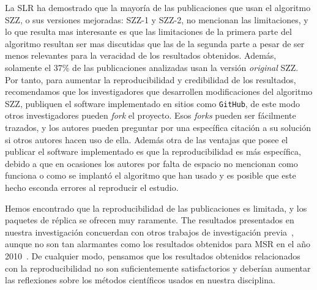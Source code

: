 \documentclass[a4paper, 12pt]{book}
\begin{document}
La SLR ha demostrado que la mayor\'ia de las publicaciones que usan el algoritmo SZZ, o sus versiones mejoradas: SZZ-1 y SZZ-2, no mencionan las limitaciones, y lo que resulta mas interesante es que las limitaciones de la primera parte del algoritmo resultan ser mas discutidas que las de la segunda parte a pesar de ser menos relevantes para la veracidad de los resultados obtenidos. Adem\'as, solamente el 37\% de las publicaciones analizadas usan la versi\'on \emph{original} SZZ.  Por tanto, para aumentar la reproducibilidad y credibilidad de los resultados, recomendamos que los investigadores que desarrollen modificaciones del algoritmo SZZ, publiquen el software implementado en sitios como \texttt{GitHub}, de este modo otros investigadores pueden \emph{fork} el proyecto. Esos \emph{forks} pueden ser f\'acilmente trazados, y los autores pueden preguntar por una espec\'ifica citaci\'on a su soluci\'on si otros autores hacen uso de ella. Adem\'as otra de las ventajas que posee el publicar el software implementado es que la reproducibilidad es m\'as espec\'ifica, debido a que en ocasiones los autores por falta de espacio no mencionan como funciona o como se implant\'o el algoritmo que han usado y es posible que este hecho esconda errores al reproducir el estudio.

Hemos encontrado que la reproducibilidad de las publicaciones es limitada, y los paquetes de r\'eplica se ofrecen muy raramente. The resultados presentados en nuestra investigaci\'on concuerdan con otros trabajos de investigaci\'on previa~\cite{amann2015software}, aunque no son tan alarmantes como los resultados obtenidos para MSR en el a\~no 2010~\cite{robles2010replicating}. De cualquier modo, pensamos que los resultados obtenidos relacionados con la reproducibilidad no son suficientemente satisfactorios y deber\'ian aumentar las reflexiones sobre los m\'etodos cient\'ificos usados en nuestra disciplina.  
\end{document}
